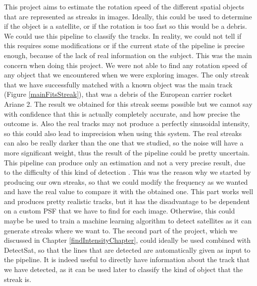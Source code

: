 \documentclass[a4paper,12pt,oneside]{report}
\begin{document}
This project aims to estimate the rotation speed of the different spatial objects that are represented as streaks in images. Ideally,
this could be used to determine if the object is a satellite, or if the rotation is too fast so this would be a debris. We could use 
this pipeline to classify the tracks.
\newline
\newline
In reality, we could not tell if this requires some modifications or if the current state of the pipeline is precise enough, because of 
the lack of real information on the subject. This was the main concern when doing this project. We were not able to find any rotation speed of any object that we encountered when we were
exploring images. The only streak that we have successfully matched with a known object was the main track (Figure \ref{mainFitsStreak}),
that was a debris of the European carrier rocket Ariane 2. The result we obtained for this streak seems possible but we cannot say
with confidence that this is actually completely accurate, and how precise the outcome is. Also the real tracks may not produce a perfectly sinusoidal intensity, so this could also lead
to imprecision when using this system. The real streaks can also be really darker than the one that we studied, so the noise will have a more 
significant weight, thus the result of the pipeline could be pretty uncertain. This pipeline can produce only an estimation and not a very
precise result, due to the difficulty of this kind of detection \cite{GeoSatellite}.
\newline
\newline
This was the reason why we started by producing our own streaks, so that we could modify the frequency as we wanted and have the real
value to compare it with the obtained one. This part works well and produces pretty realistic tracks, but it has the disadvantage to be
dependent on a custom PSF that we have to find for each image. Otherwise, this could maybe be used to train a machine learning algorithm
to detect satellites as it can generate streaks where we want to. 
\newline
\newline
The second part of the project, which we discussed in Chapter \ref{findIntensityChapter}, could ideally be used combined with DetectSat,
so that the lines that are detected are automatically given as input to the pipeline. It is indeed useful to directly have information
about the track that we have detected, as it can be used later to classify the kind of object that the streak is. 
\end{document}

